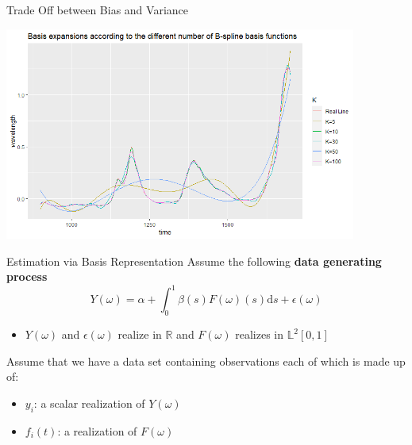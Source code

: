 \documentclass{beamer}
\begin{document}
	\begin{frame}{Trade Off between Bias and Variance}
		\begin{minipage}[t]{\textwidth}
			\includegraphics[height = 7cm]{../Graphics/Trade_off.png}
		\end{minipage}
	\end{frame}


	\begin{frame}{Estimation via Basis Representation}
		Assume the following \textbf{data generating process}
		$$Y(\omega) = \alpha + \int_{0}^{1} \beta(s) F(\omega)(s) \mathrm{d}s + \epsilon(\omega)$$
		\begin{itemize}
			\item $Y(\omega)$ and $\epsilon(\omega)$ realize in $\mathbb{R}$ and $F(\omega)$ realizes in $\mathbb{L}^2[0,1]$
		\end{itemize}
		\vspace{0.2cm}
		
		Assume that we have a data set containing observations each of which is made up of:
		\begin{itemize}
			\item $y_i$: a scalar realization of $Y(\omega)$
			\item $f_i(t)$: a realization of $F(\omega)$
		\end{itemize}

	\end{frame}
\end{document}
